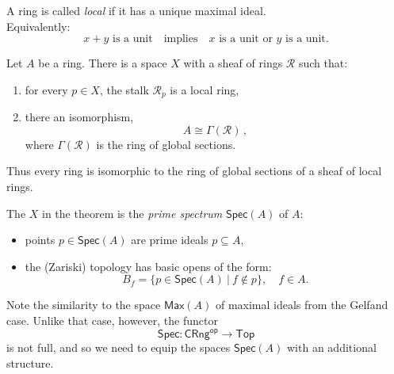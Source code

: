 \documentclass[lambek.tex]{subfiles}
\begin{document}

\begin{definition} A  ring is called \emph{local} if it has a unique maximal ideal. \\
Equivalently: 
\begin{equation}\label{eq:localring}
\text{$x+y$ is a unit}\quad\text{implies}\quad\text{$x$ is a unit or $y$ is a unit}.
\end{equation}
\end{definition}
%
\begin{theorem}[Grothendieck]
Let $A$ be a ring.  There is a space $X$ with a sheaf of rings $\mathcal{R}$ such that:
\begin{enumerate}
\item for every $p\in X$, the stalk $\mathcal{R}_p$ is a local ring, 
\item there an isomorphism, $$A\cong \Gamma(\mathcal{R})\,,$$
where $\Gamma(\mathcal{R})$ is the ring of global sections.
\end{enumerate}
Thus every ring is isomorphic to the ring of global sections of a sheaf of local rings.
\end{theorem}


The  $X$ in the theorem is the \emph{prime spectrum} $\mathsf{Spec}(A)$ of $A$:
 \begin{itemize}
\item points $p\in \mathsf{Spec}(A)$ are prime ideals $p\subseteq A$,
\item the (Zariski) topology has basic opens of the form:
 $$B_f = \{ p\in \mathsf{Spec}(A)\ |\ f\not\in p \}, \quad f\in A.$$
\end{itemize}
Note the similarity to the space $\mathsf{Max}(A)$ of maximal ideals from the Gelfand case.  
Unlike that case, however, the functor 
\[
\mathsf{Spec} : \mathsf{CRng}^\mathsf{op} \to \mathsf{Top}
 \]
is not full, and so we need to equip the spaces  $\mathsf{Spec}(A)$ with an additional structure.
\end{document}
